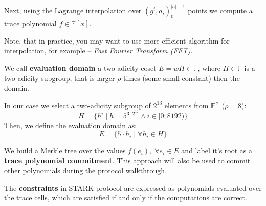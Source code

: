 \documentclass[../lecture-notes.tex]{subfiles}
\begin{document}
Next, using the Lagrange interpolation over $(g^i, a_i)_0^{|a| - 1}$ points we compute a trace polynomial $f \in \mathbb{F}[x]$.

\begin{remark}
Note, that in practice, you may want to use more efficient algorithm for interpolation, for example -- \textit{Fast Fourier Transform (FFT)}.
\end{remark}

\begin{definition}
We call \textbf{evaluation domain} a two-adicity coset $E = wH\in \mathbb{F}$, where $H \in \mathbb{F}$ is a two-adicity subgroup, that is larger $\rho$ times (some small constant) then the domain. 
\end{definition}

\begin{example}
In our case we select a two-adicity subgroup of $2^{13}$ elements from $\mathbb{F}^\times$ ($\rho = 8$): 
\begin{equation*}
H = \{h^i \;|\; h = 5^{3\cdot 2^{17}} \land i \in [0;8192) \}
\end{equation*}
Then, we define the evaluation domain as:
\begin{equation*}
E = \{5\cdot h_i \;|\; \forall h_i \in H\}  
\end{equation*}
\end{example}

We build a Merkle tree over the values $f(e_i),\; \forall e_i \in E$ and label it's root as a \textbf{trace polynomial commitment}. This approach will also be used to commit other polynomials during the protocol walkthrough.

The \textbf{constraints} in STARK protocol are expressed as polynomials evaluated over the trace cells, which are satisfied if and only if the computations are correct.
\end{document}
